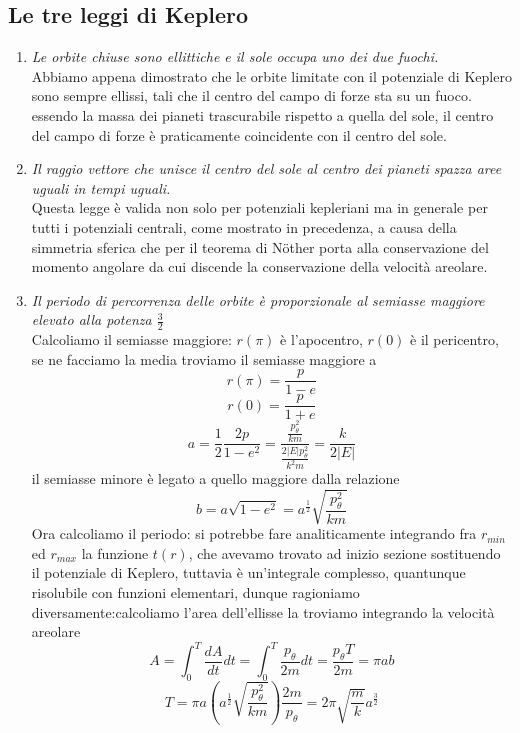 \documentclass[
10pt, %
a4paper, %
oneside, %
headinclude,footinclude, %
BCOR5mm, %
]{scrartcl}
\begin{document}
\subsection{Le tre leggi di Keplero}
\begin{enumerate}
	\item \textit{Le orbite chiuse sono ellittiche e il sole occupa uno dei due fuochi.}\\
	Abbiamo appena dimostrato che le orbite limitate con il potenziale di Keplero sono sempre ellissi, tali che il centro del campo di forze sta su un fuoco. essendo la massa dei pianeti trascurabile rispetto a quella del sole, il centro del campo di forze è praticamente coincidente con il centro del sole.
	\item \textit{Il raggio vettore che unisce il centro del sole al centro dei pianeti spazza aree uguali in tempi uguali.}\\
	Questa legge è valida non solo per potenziali kepleriani ma in generale per tutti i potenziali centrali, come mostrato in precedenza, a causa della simmetria sferica che per il teorema di N\"{o}ther porta alla conservazione del momento angolare da cui discende la conservazione della velocità areolare.
	\item \textit{Il periodo di percorrenza delle orbite è proporzionale al semiasse maggiore elevato alla potenza \(\frac{3}{2}\)}\\
	Calcoliamo il semiasse maggiore: \(r(\pi)\) è l'apocentro, \(r(0)\) è il pericentro, se ne facciamo la media troviamo il semiasse maggiore a
	\[r(\pi) = \frac{p}{1-e}\]
	\[r(0) = \frac{p}{1+e}\]
	\[a = \frac{1}{2}\frac{2p}{1-e^2} = \frac{\frac{p_\theta^2}{km}}{\frac{2|E|p_\theta^2}{k^2m}} = \frac{k}{2|E|}\]
	il semiasse minore è legato a quello maggiore dalla relazione
	\[b = a\sqrt{1-e^2} = a^{\frac{1}{2}}\sqrt{\frac{p_\theta^2}{km}}\]
	Ora calcoliamo il periodo: si potrebbe fare analiticamente integrando fra \(r_{min}\) ed \(r_{max}\) la funzione \(t(r)\), che avevamo trovato ad inizio sezione sostituendo il potenziale di Keplero, tuttavia è un'integrale complesso, quantunque risolubile con funzioni elementari, dunque ragioniamo diversamente:calcoliamo l'area dell'ellisse la troviamo integrando la velocità areolare
	\[A = \int_{0}^T\frac{dA}{dt}dt = \int_{0}^T\frac{p_\theta}{2m}dt = \frac{p_\theta T}{2m} = \pi ab\]
	\[T = \pi a \left(a^{\frac{1}{2}}\sqrt{\frac{p_\theta^2}{km}}\right)\frac{2m}{p_\theta} = 2\pi \sqrt{\frac{m}{k}}a^{\frac{3}{2}} \]	 
	\begin{osservazione}

\end{osservazione}
\end{enumerate}
\end{document}

